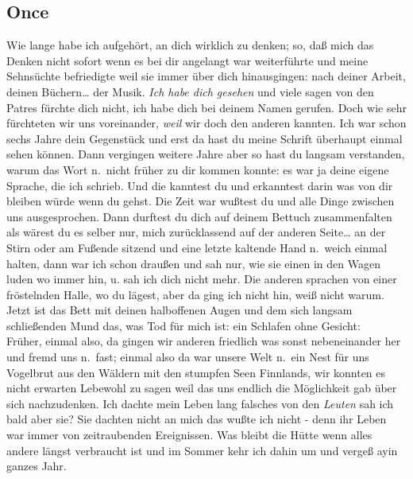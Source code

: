 \documentclass[
]{article}
\author{}
\date{\vspace{-2.5em}}
\begin{document}
\subsection{Once}\label{once}

Wie lange habe ich aufgehört, an dich wirklich zu denken; so, daß mich
das Denken nicht sofort wenn es bei dir angelangt war weiterführte und
meine Sehnsüchte befriedigte weil sie immer über dich hinausgingen: nach
deiner Arbeit, deinen Büchern\ldots{} der Musik. \emph{Ich habe dich
gesehen} und viele sagen von den Patres fürchte dich nicht, ich habe
dich bei deinem Namen gerufen. Doch wie sehr fürchteten wir uns
voreinander, \emph{weil} wir doch den anderen kannten. Ich war schon
sechs Jahre dein Gegenstück und erst da hast du meine Schrift überhaupt
einmal sehen können. Dann vergingen weitere Jahre aber so hast du
langsam verstanden, warum das Wort n.~nicht früher zu dir kommen konnte:
es war ja deine eigene Sprache, die ich schrieb. Und die kanntest du und
erkanntest darin was von dir bleiben würde wenn du gehst. Die Zeit war
wußtest du und alle Dinge zwischen uns ausgesprochen. Dann durftest du
dich auf deinem Bettuch zusammenfalten als wärest du es selber nur, mich
zurücklassend auf der anderen Seite\ldots{} an der Stirn oder am Fußende
sitzend und eine letzte kaltende Hand n.~weich einmal halten, dann war
ich schon draußen und sah nur, wie sie einen in den Wagen luden wo immer
hin, u. sah ich dich nicht mehr. Die anderen sprachen von einer
fröstelnden Halle, wo du lägest, aber da ging ich nicht hin, weiß nicht
warum. Jetzt ist das Bett mit deinen halboffenen Augen und dem sich
langsam schließenden Mund das, was Tod für mich ist: ein Schlafen ohne
Gesicht:\\
Früher, einmal also, da gingen wir anderen friedlich was sonst
nebeneinander her und fremd uns n.~fast; einmal also da war unsere Welt
n.~ein Nest für uns Vogelbrut aus den Wäldern mit den stumpfen Seen
Finnlands, wir konnten es nicht erwarten Lebewohl zu sagen weil das uns
endlich die Möglichkeit gab über sich nachzudenken. Ich dachte mein
Leben lang falsches von den \emph{Leuten} sah ich bald aber sie? Sie
dachten nicht an mich das wußte ich nicht - denn ihr Leben war immer von
zeitraubenden Ereignissen. Was bleibt die Hütte wenn alles andere längst
verbraucht ist und im Sommer kehr ich dahin um und vergeß ayin ganzes
Jahr.
\end{document}

